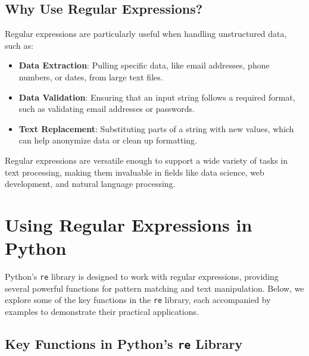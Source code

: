 \documentclass[
  letterpaper,
  DIV=11,
  numbers=noendperiod]{scrreprt}
\providecommand{\tightlist}{%
  \setlength{\itemsep}{0pt}\setlength{\parskip}{0pt}}\usepackage{longtable,booktabs,array}
\begin{document}
\hypertarget{why-use-regular-expressions}{%
\subsection{Why Use Regular
Expressions?}\label{why-use-regular-expressions}}

Regular expressions are particularly useful when handling unstructured
data, such as:

\begin{itemize}
\tightlist
\item
  \textbf{Data Extraction}: Pulling specific data, like email addresses,
  phone numbers, or dates, from large text files.
\item
  \textbf{Data Validation}: Ensuring that an input string follows a
  required format, such as validating email addresses or passwords.
\item
  \textbf{Text Replacement}: Substituting parts of a string with new
  values, which can help anonymize data or clean up formatting.
\end{itemize}

Regular expressions are versatile enough to support a wide variety of
tasks in text processing, making them invaluable in fields like data
science, web development, and natural language processing.

\hypertarget{using-regular-expressions-in-python}{%
\section{Using Regular Expressions in
Python}\label{using-regular-expressions-in-python}}

Python's \texttt{re} library is designed to work with regular
expressions, providing several powerful functions for pattern matching
and text manipulation. Below, we explore some of the key functions in
the \texttt{re} library, each accompanied by examples to demonstrate
their practical applications.

\hypertarget{key-functions-in-pythons-re-library}{%
\subsection{\texorpdfstring{Key Functions in Python's \texttt{re}
Library}{Key Functions in Python's re Library}}\label{key-functions-in-pythons-re-library}}
\end{document}
